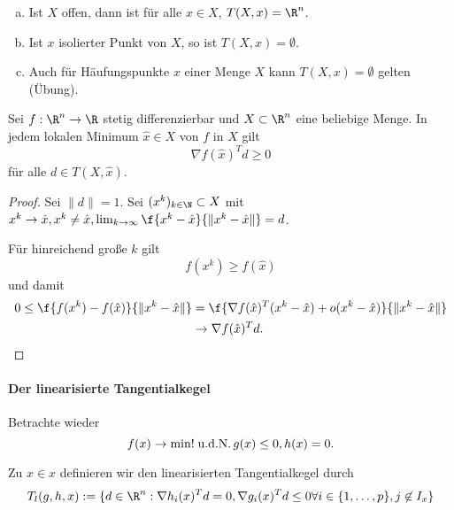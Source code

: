 \begin{ex} \label{3.14}
	\begin{enumerate}[(a)]
		\item
			Ist $X$ offen, dann ist für alle $x \in X$, $T(X, x) = \R^n$.
		\item
			Ist $x$ isolierter Punkt von $X$, so ist $T(X, x) = \emptyset$.
		\item
			Auch für Häufungspunkte $x$ einer Menge $X$ kann $T(X, x) = \emptyset$ gelten (Übung).
	\end{enumerate}
\end{ex}

\begin{st} \label{3.15}
	Sei $f: \R^n \to \R$ stetig differenzierbar und $X \subset \R^n$ eine beliebige Menge.
	In jedem lokalen Minimum $\hat x \in X$ von $f$ in $X$ gilt
	\[
		\nabla f(\hat x)^T d \ge 0
	\]
	für alle $d \in T(X, \hat x)$.
	\begin{proof}
		Sei \oBdA $\|d\| = 1$.
		Sei $(x^k)_{k\in\N} \subset X$ mit $x^k \to \hat x, x^k \neq \hat x, \lim_{k\to \infty} \f{x^k-\hat x}{\|x^k - \hat x\|} = d$.

		Für hinreichend große $k$ gilt
		\[
			f(x^k) \ge f(\hat x)
		\]
		und damit
		\begin{align*}
			0 \le \f {f(x^k) - f(\hat x)}{\|x^k - \hat x\|}
			&= \f{\nabla f(\hat x)^T (x^k - \hat x) + o(x^k - \hat x)}{\|x^k - \hat x\|} \\
			&\to \nabla f(\hat x)^T d.
		\end{align*}
	\end{proof}
\end{st}

\paragraph{Der linearisierte Tangentialkegel}

Betrachte wieder
\[
	f(x) \to \min! \;\text{u.d.N.}\, g(x) \le 0, h(x) = 0.
\]

\begin{df} \label{3.16}
	Zu $x \in x$ definieren wir den linearisierten Tangentialkegel durch
	\[
		T_l(g,h,x) := \{d \in \R^n : \nabla h_i(x)^T d = 0, \nabla g_i(x)^T d \le 0 \forall i \in \{1,\dotsc,p\}, j \not\in I_x \}
	\]
\end{df}

